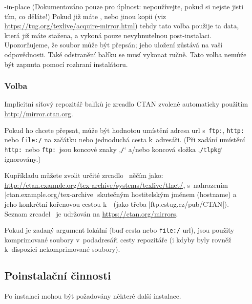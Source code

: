 \documentclass[\classoptions,slovak,english,czech]{\classname}
\newcommand{\singleuv}[1]{,#1`}
\begin{document}
\begin{ttdescription}
\item[-in-place] (Dokumentováno pouze pro úplnost: nepoužívejte, pokud
  si nejste jisti tím, co děláte!) 
  Pokud již máte ,  nebo jinou kopii \TL{} (viz
  \url{https://tug.org/texlive/acquire-mirror.html}) tehdy tato volba
  použije ta data, která již máte stažena, a vykoná pouze nevyhnutelnou
  post-instalaci. Upozorňujeme, že soubor 
  může být přepsán; jeho uložení zůstává na vaší odpovědnosti. Také odstranění 
  balíku se musí vykonat ručně. Tato volba nemůže být zapnuta pomocí 
  rozhraní instalátoru.
\end{ttdescription}


\subsubsection{Volba }
\label{sec:location}

Implicitní síťový repozitář balíků je zrcadlo CTAN zvolené automaticky
použitím \url{http://mirror.ctan.org}.

Pokud ho chcete přepsat, může být hodnotou umístění 
adresa url s~\texttt{ftp:}, \texttt{http:} nebo 
\texttt{file:/} na začátku nebo jednoduchá cesta k~adresáři.  
(Při zadání umístění \texttt{http:}\ nebo \texttt{ftp:}\ 
jsou koncové znaky \singleuv{\texttt{/}} a/nebo koncová složka
 \singleuv{\texttt{/tlpkg}} ignorovány.)

Kupříkladu můžete zvolit určité zrcadlo \CTAN\ něčím 
jako: \url{http://ctan.example.org/tex-archive/systems/texlive/tlnet/},
s~nahrazením |ctan.example.org/tex-archive| skutečným 
hostitelským jménem (hostname) a jeho konkrétní kořenovou 
cestou k~\CTAN\ (jako třeba |ftp.cstug.cz/pub/CTAN|).   
Seznam zrcadel \CTAN\ je udržován na \url{https://ctan.org/mirrors}.

Pokud je zadaný argument lokální (buď cesta nebo \texttt{file:/} url),
jsou použity komprimované soubory v~podadresáři \dirname{archive}
cesty repozitáře (i kdyby byly rovněž k~dispozici nekomprimované soubory).

\subsection{Poinstalační činnosti}
\label{sec:postinstall}

Po instalaci mohou být požadovány některé další instalace.

\end{document}
